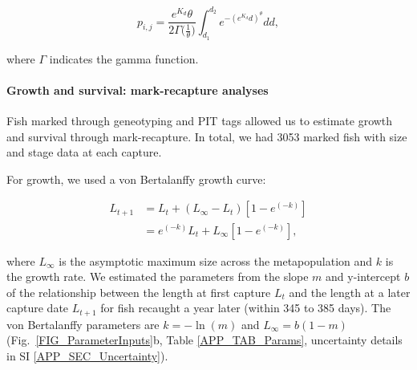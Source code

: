 \documentclass[12pt, oneside]{article}   	%
\begin{document}
\begin{equation} %
p_{i,j} = \frac{e^{K_d}\theta}{2\Gamma({\frac{1}{\theta})}} \int_{d_1}^{d_2}e^{-(e^{K_d}d)^\theta}  dd, \label{EQN_integratingDK}
\end{equation}

where $\Gamma$ indicates the gamma function.

\paragraph*{Growth and survival: mark-recapture analyses}

Fish marked through geneotyping and PIT tags allowed us to estimate growth and survival through mark-recapture. In total, we had 3053 marked fish with size and stage data at each capture. 

For growth, we used a von Bertalanffy growth curve:

\begin{equation} \label{EQN_VBL} 
\begin{split}
L_{t+1} & = L_t + (L_\infty - L_t)[1 - e^{(-k)}] \\
 & = e^{(-k)}L_t + L_\infty[1 - e^{(-k)}],
\end{split}
\end{equation}

where $L_\infty$ is the asymptotic maximum size across the metapopulation and $k$ is the growth rate. We estimated the parameters from the slope $m$ and y-intercept $b$ of the relationship between the length at first capture $L_t$ and the length at a later capture date $L_{t+1}$ for fish recaught a year later (within 345 to 385 days). The von Bertalanffy parameters are $k = -\ln(m)$ and $L_\infty = b(1-m)$ \citep{hart2009estimating} (Fig.\ \ref{FIG_ParameterInputs}b, Table \ref{APP_TAB_Params}, uncertainty details in SI \ref{APP_SEC_Uncertainty}).
\end{document}
